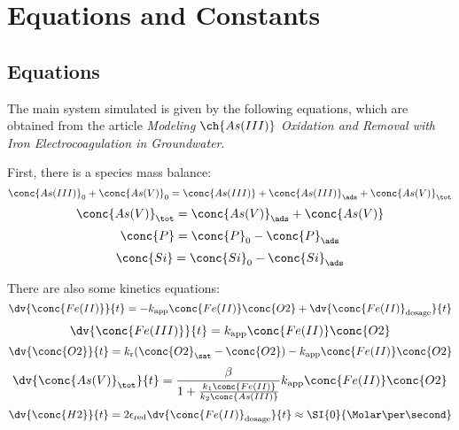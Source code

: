 \documentclass[11pt]{scrartcl} %
\begin{document}
    \section{Equations and Constants}

        \subsection{Equations}

            The main system simulated is given by the following equations, which are obtained from the article \textit{Modeling} $\ch{As (III)}$ \textit{Oxidation and Removal with Iron Electrocoagulation in Groundwater}.

            First, there is a species mass balance:
            \begin{equation}
                \conc{As (III)}_0 + \conc{As (V)}_0 = \conc{As (III)} + \conc{As (III)}_\ads + \conc{As (V)}_{\tot}
            \end{equation}
            \begin{equation}
                \conc{As (V)}_\tot = \conc{As (V)}_\ads + \conc{As (V)}
            \end{equation}
            \begin{equation}
                \conc{P} = \conc{P}_0 - \conc{P}_\ads
            \end{equation}
            \begin{equation}
                \conc{Si} = \conc{Si}_0 - \conc{Si}_\ads
            \end{equation}

            There are also some kinetics equations:
            \begin{equation}
                \dv{\conc{Fe(II)}}{t} = -k_{\mathrm{app}}\conc{Fe(II)}\conc{O2} + \dv{\conc{Fe (II)}_{\mathrm{dosage}}}{t}
            \end{equation}
            \begin{equation}
                \dv{\conc{Fe (III)}}{t} = k_{\mathrm{app}}\conc{Fe (II)}\conc{O2}
            \end{equation}
            \begin{equation}
                \dv{\conc{O2}}{t} = k_{\mathrm{r}}(\conc{O2}_{\sat} - \conc{O2}) - k_{\mathrm{app}}\conc{Fe (II)}\conc{O2}
            \end{equation}
            \begin{equation}
                \dv{\conc{As  (V)}_\tot}{t} = \frac{\beta}{1 + \frac{k_1\conc{Fe (II)}}{k_2\conc{As (III)}}}k_{\mathrm{app}}\conc{Fe (II)}\conc{O2}
            \end{equation}
            \begin{equation}
                \dv{\conc{H2}}{t} = 2\epsilon_{\mathrm{red}}\dv{\conc{Fe (II)}_{\mathrm{dosage}}}{t} \approx \SI{0}{\Molar\per\second} 
            \end{equation}
\end{document}

